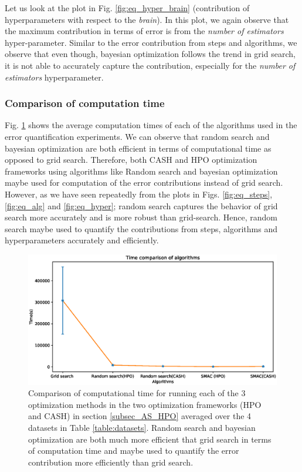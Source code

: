 Let us look at the plot in Fig. \ref{fig:eq_hyper_brain} (contribution of hyperparameters with respect to the \textit{brain}). In this plot, we again observe that the maximum contribution in terms of error is from the \textit{number of estimators} hyper-parameter. Similar to the error contribution from steps and algorithms, we observe that even though, bayesian optimization follows the trend in grid search, it is not able to accurately capture the contribution, especially for the \textit{number of estimators} hyperparameter.


\subsubsection{Comparison of computation time}
Fig. \ref{fig:time} shows the average computation times of each of the algorithms used in the error quantification experiments. We can observe that random search and bayesian optimization are both efficient in terms of computational time as opposed to grid search.
Therefore, both CASH and HPO optimization frameworks using algorithms like Random search and bayesian optimization maybe used for computation of the error contributions instead of grid search. However, as we have seen repeatedly from the plots in Figs. \ref{fig:eq_steps}, \ref{fig:eq_alg} and \ref{fig:eq_hyper}; random search captures the behavior of grid search more accurately and is more robust than grid-search. Hence, random search maybe used to quantify the contributions from steps, algorithms and hyperparameters accurately and efficiently.

\begin{figure}[ht!]
    \centering
    \includegraphics[scale=0.4]{img/EP/times_algorithms.eps}
    \caption{Comparison of computational time for running each of the 3 optimization methods in the two optimization frameworks (HPO and CASH) in section \ref{subsec_AS_HPO} averaged over the 4 datasets in Table \ref{table:datasets}. Random search and bayesian optimization are both much more efficient that grid search in terms of computation time and maybe used to quantify the error contribution more efficiently than grid search.}
    \label{fig:time}
\end{figure}

